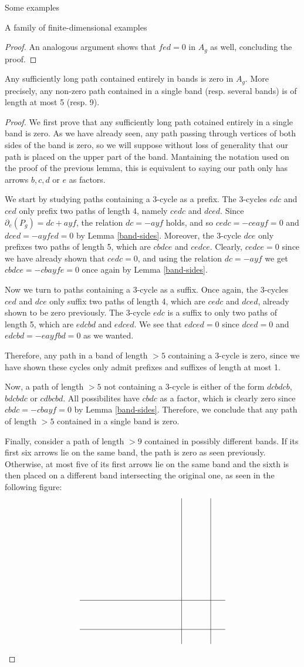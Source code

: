 \begin{chapter}{Some examples}
\begin{section}{A family of finite-dimensional examples}
\begin{proof}
An analogous argument shows that $fed=0$ in $A_g$ as well, concluding the proof. 
\end{proof}

\begin{lemma}\label{long-band-paths} Any sufficiently long path contained entirely in bands is zero in $A_g$. More precisely, any non-zero path contained in a single band (resp. several bands) is of length at most 5 (resp. 9).
\end{lemma}
\begin{proof} We first prove that any sufficiently long path cotained entirely in a single band is zero. As we have already seen, any path passing through vertices of both sides of the band is zero, so we will suppose without loss of generality that our path is placed on the upper part of the band. Mantaining the notation used on the proof of the previous lemma, this is equivalent to saying our path only has arrows $b, c, d$ or $e$ as factors.

We start by studying paths containing a $3$-cycle as a prefix. The $3$-cycles $edc$ and $ced$ only prefix two paths of length 4, namely $cedc$ and $dced$. Since $\partial_e(P_g) = dc + ayf$, the relation $dc = -ayf$ holds, and so $cedc=-ceayf=0$ and $dced=-ayfed=0$ by Lemma \ref{band-sides}. Moreover, the $3$-cycle $dce$ only prefixes two paths of length 5, which are $cbdce$ and $cedce$. Clearly, $cedce=0$ since we have already shown that $cedc=0$, and using the relation $dc=-ayf$ we get $cbdce = - cbayfe=0$ once again by Lemma \ref{band-sides}.

Now we turn to paths containing a $3$-cycle as a suffix. Once again, the $3$-cycles $ced$ and $dce$ only suffix two paths of length 4, which are $cedc$ and $dced$, already shown to be zero previously. The $3$-cycle $edc$ is a suffix to only two paths of length 5, which are $edcbd$ and $edced$. We see that $edced=0$ since $dced=0$ and $edcbd=-eayfbd=0$ as we wanted.

Therefore, any path in a band of length $>5$ containing a 3-cycle is zero, since we have shown these cycles only admit prefixes and suffixes of length at most 1.

Now, a path of length $>5$ not containing a 3-cycle is either of the form $dcbdcb$, $bdcbdc$ or $cdbcbd$. All possibilites have $cbdc$ as a factor, which is clearly zero since $cbdc = -cbayf = 0$ by Lemma \ref{band-sides}. Therefore, we conclude that any path of length $>5$ contained in a single band is zero.

Finally, consider a path of length $>9$ contained in possibly different bands. If its first six arrows lie on the same band, the path is zero as seen previously. Otherwise, at most five of its first arrows lie on the same band and the sixth is then placed on a different band intersecting the original one, as seen in the following figure:
\[
\begin{tikzpicture}
\draw (-3.5*1.25, 0) -- (1.5*1.25, 0);
\draw (-3.5*1.25, -1.25) -- (1.5*1.25, -1.25);
\draw (0,3.5*1.25) -- (0,-1.5*1.25);
\draw (1.25,3.5*1.25) -- (1.25,-1.5*1.25);


\end{tikzpicture}\]
\end{proof}
\end{section}
\end{chapter}
